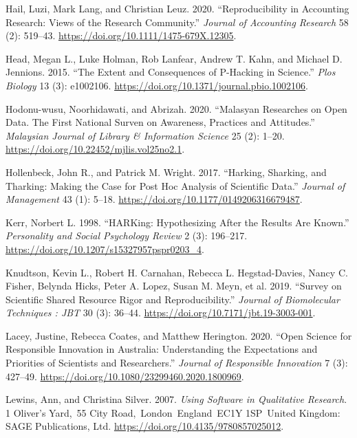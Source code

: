 \documentclass[
  letterpaper,
]{article}
\newlength{\cslhangindent}
\newenvironment{CSLReferences}[2] %
 {\begin{list}{}{%
  \setlength{\itemindent}{0pt}
  \setlength{\leftmargin}{0pt}
  \setlength{\parsep}{0pt}
  \ifodd #1
   \setlength{\leftmargin}{\cslhangindent}
   \setlength{\itemindent}{-1\cslhangindent}
  \fi
  \setlength{\itemsep}{#2\baselineskip}}}
 {\end{list}}
\begin{document}
\begin{CSLReferences}{1}{0}
Hail, Luzi, Mark Lang, and Christian Leuz. 2020. {``Reproducibility in
{Accounting Research}: {Views} of the {Research Community}.''}
\emph{Journal of Accounting Research} 58 (2): 519--43.
\url{https://doi.org/10.1111/1475-679X.12305}.

Head, Megan L., Luke Holman, Rob Lanfear, Andrew T. Kahn, and Michael D.
Jennions. 2015. {``The {Extent} and {Consequences} of {P-Hacking} in
{Science}.''} \emph{Plos Biology} 13 (3): e1002106.
\url{https://doi.org/10.1371/journal.pbio.1002106}.

Hodonu-wusu, Noorhidawati, and Abrizah. 2020. {``Malasyan Researches on
Open Data. {The} First National Surven on Awareness, Practices and
Attitudes.''} \emph{Malaysian Journal of Library \& Information Science}
25 (2): 1--20. \url{https://doi.org/10.22452/mjlis.vol25no2.1}.

Hollenbeck, John R., and Patrick M. Wright. 2017. {``Harking,
{Sharking}, and {Tharking}: {Making} the {Case} for {Post Hoc Analysis}
of {Scientific Data}.''} \emph{Journal of Management} 43 (1): 5--18.
\url{https://doi.org/10.1177/0149206316679487}.

Kerr, Norbert L. 1998. {``{HARKing}: {Hypothesizing After} the {Results}
Are {Known}.''} \emph{Personality and Social Psychology Review} 2 (3):
196--217. \url{https://doi.org/10.1207/s15327957pspr0203_4}.

Knudtson, Kevin L., Robert H. Carnahan, Rebecca L. Hegstad-Davies, Nancy
C. Fisher, Belynda Hicks, Peter A. Lopez, Susan M. Meyn, et al. 2019.
{``Survey on {Scientific Shared Resource Rigor} and
{Reproducibility}.''} \emph{Journal of Biomolecular Techniques : JBT} 30
(3): 36--44. \url{https://doi.org/10.7171/jbt.19-3003-001}.

Lacey, Justine, Rebecca Coates, and Matthew Herington. 2020. {``Open
Science for Responsible Innovation in {Australia}: {Understanding} the
Expectations and Priorities of Scientists and Researchers.''}
\emph{Journal of Responsible Innovation} 7 (3): 427--49.
\url{https://doi.org/10.1080/23299460.2020.1800969}.

Lewins, Ann, and Christina Silver. 2007. \emph{Using {Software} in
{Qualitative Research}}. 1 Oliver's Yard,~55 City
Road,~London~England~EC1Y 1SP~United Kingdom: SAGE Publications, Ltd.
\url{https://doi.org/10.4135/9780857025012}.


\end{CSLReferences}
\end{document}
